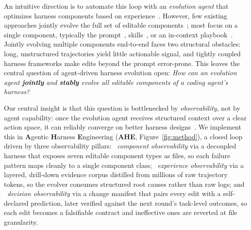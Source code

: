 An intuitive direction is to automate this loop with an \textit{evolution agent} that optimizes harness components based on experience~\citep{agrawalGEPAReflectivePrompt2025a,zhangAgenticContextEngineering2025a,caiTrainingFreeGroupRelative2025}.
However, few existing approaches jointly evolve the full set of editable components~\citep{leeMetaHarnessEndtoEndOptimization2026}; most focus on a single component, typically the prompt~\citep{shinnReflexionLanguageAgents2023c,zhaoExpeLLLMAgents2024,madaanSelfRefineIterativeRefinement2023c}, skills~\citep{maSkillClawLetSkills2026b,xiaSkillRLEvolvingAgents2026c}, or an in-context playbook~\citep{zhangAgenticContextEngineering2025a}.
Jointly evolving multiple components end-to-end faces two structural obstacles: long, unstructured trajectories yield little actionable signal, and tightly coupled harness frameworks make edits beyond the prompt error-prone.
This leaves the central question of agent-driven harness evolution open:
\textit{How can an evolution agent \textbf{jointly} and \textbf{stably} evolve all editable components of a coding agent's harness?}


Our central insight is that this question is bottlenecked by \emph{observability}, not by agent capability: once the evolution agent receives structured context over a clear action space, it can reliably converge on better harness designs~\citep{suttonBitterLesson2019,zunicBitterLessonAgent2026}.
We implement this in \textbf{A}gentic \textbf{H}arness \textbf{E}ngineering 
(\textbf{AHE}, Figure~\ref{fig:method}), a closed loop driven by three observability pillars:
~\emph{component observability} via a decoupled harness that exposes seven editable component types as files, so each failure pattern maps cleanly to a single component class;
~\emph{experience observability} via a layered, drill-down evidence corpus distilled from millions of raw trajectory tokens, so the evolver consumes structured root causes rather than raw logs; and
~\emph{decision observability} via a change manifest that pairs every edit with a self-declared prediction, later verified against the next round's task-level outcomes, so each edit becomes a falsifiable contract and ineffective ones are reverted at file granularity.


